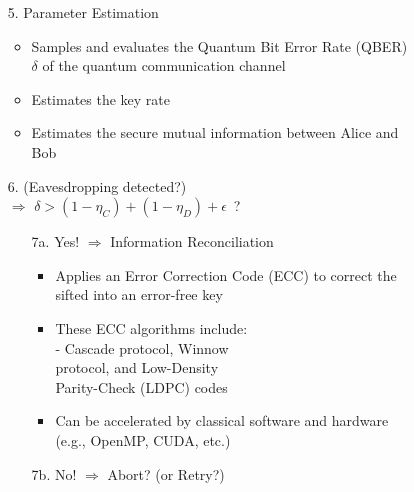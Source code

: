 \documentclass{beamer}
\begin{document}
\begin{frame}
\begin{figure}
\begin{minipage}{0.4\textwidth}
                    \caption{\color{blue}{Figure 2: }\color{black}{Flowchart of a QKD protocol}}
                    \label{fig:qkd-protocol-flowchart-2}
                \end{minipage}%
                \hspace{0.05\textwidth}%
                \begin{minipage}{0.55\textwidth}
                    \begin{enumerate}\footnotesize
                        \item[5.] Parameter Estimation
                        \begin{itemize}\scriptsize
                            \item Samples and evaluates the Quantum Bit Error Rate (QBER) $\delta$ of the quantum communication channel
                            \item Estimates the key rate
                            \item Estimates the secure mutual information between Alice and Bob
                        \end{itemize}
                        \item[6.] (Eavesdropping detected?)\\$\Rightarrow$ $\delta > (1 - {\eta}_{C}) + (1 - {\eta}_{D}) + \epsilon$\ ?
                        \begin{enumerate}\scriptsize
                            \item[7a.] Yes! $\Rightarrow$ Information Reconciliation
                            \begin{itemize}\scriptsize
                                \item Applies an Error Correction Code (ECC) to correct the sifted into an error-free key
                                \item These ECC algorithms include:\\
                                - Cascade protocol, Winnow\\\hspace{1ex}protocol, and Low-Density\\\hspace{1ex}Parity-Check (LDPC) codes
                                \item Can be accelerated by classical software and hardware\\(e.g., OpenMP, CUDA, etc.)
                            \end{itemize}
                            \item[7b.] No! $\Rightarrow$ Abort? (or Retry?)
                        \end{enumerate}
                    \end{enumerate}
                \end{minipage}
            \end{figure}
   
		\end{frame}
  
\end{document}
